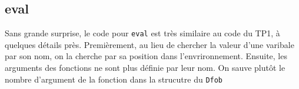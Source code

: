 \documentclass{article}
\begin{document}
\subsection*{eval}
Sans grande surprise, le code pour \texttt{eval} est très similaire au code du TP1, à quelques détails près. Premièrement, au lieu de chercher la valeur d'une varibale par son nom, on la cherche par sa position dans l'envrironnement. Ensuite, les arguments des fonctions ne sont plus définie par leur nom. On sauve plutôt le nombre d'argument de la fonction dans la strucutre du \texttt{Dfob} 
\end{document}
